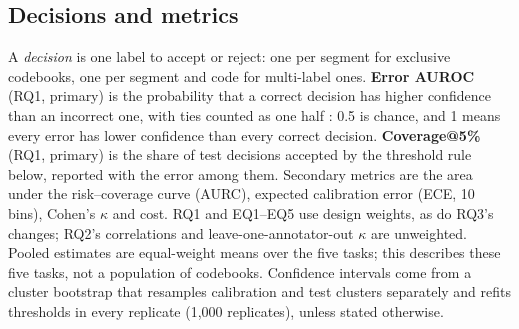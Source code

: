 

\subsection{Decisions and metrics}
A \emph{decision} is one label to accept or reject: one per segment for exclusive codebooks, one per segment and code for
multi-label ones. \textbf{Error AUROC} (RQ1, primary) is the probability that a correct decision has higher confidence than an
incorrect one, with ties counted as one half \citep{hendrycks2017baseline}: 0.5 is chance, and 1 means every error has lower
confidence than every correct decision. \textbf{Coverage@5\%} (RQ1, primary) is the share of
test decisions accepted by the threshold rule below, reported with the error among them. Secondary metrics are the area under
the risk--coverage curve (AURC), expected calibration error (ECE, 10 bins), Cohen's $\kappa$ \citep{cohen1960coefficient} and
cost. RQ1 and EQ1--EQ5 use design weights, as do RQ3's changes; RQ2's correlations and leave-one-annotator-out $\kappa$ are
unweighted. Pooled estimates are equal-weight means over the five tasks; this describes these five tasks, not a population
of codebooks. Confidence intervals come from a cluster bootstrap that resamples calibration and test clusters separately and
refits thresholds in every replicate (1,000 replicates), unless stated otherwise.

